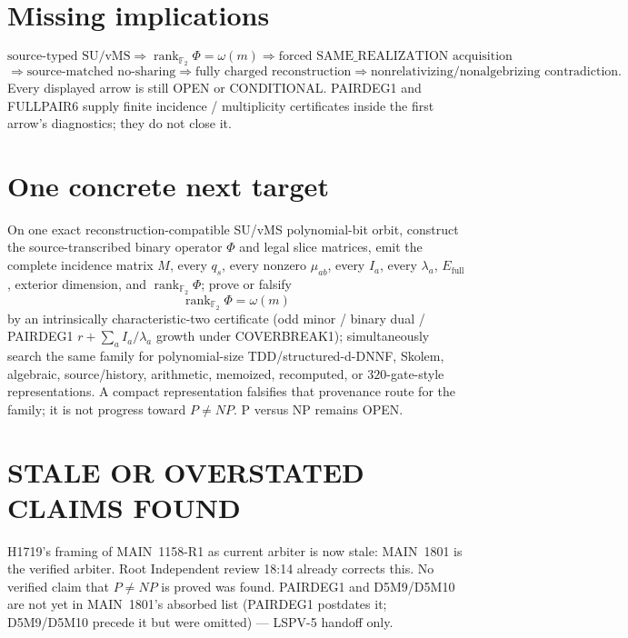 \documentclass[11pt]{article}
\begin{document}
\section*{Missing implications}
\[
\text{source-typed SU/vMS}
\Longrightarrow
\operatorname{rank}_{\mathbb F_2}\Phi=\omega(m)
\Longrightarrow
\text{forced SAME\_REALIZATION acquisition}
\]
\[
\Longrightarrow
\text{source-matched no-sharing}
\Longrightarrow
\text{fully charged reconstruction}
\Longrightarrow
\text{nonrelativizing/nonalgebrizing contradiction}.
\]
Every displayed arrow is still OPEN or CONDITIONAL. PAIRDEG1 and FULLPAIR6
supply finite incidence / multiplicity certificates inside the first arrow's
diagnostics; they do not close it.

\section*{One concrete next target}
On one exact reconstruction-compatible SU/vMS polynomial-bit orbit, construct the
source-transcribed binary operator $\Phi$ and legal slice matrices, emit the
complete incidence matrix $M$, every $q_s$, every nonzero $\mu_{ab}$, every
$I_a$, every $\lambda_a$, $E_{\mathrm{full}}$, exterior dimension, and
$\operatorname{rank}_{\mathbb F_2}\Phi$; prove or falsify
\[
\operatorname{rank}_{\mathbb F_2}\Phi=\omega(m)
\]
by an intrinsically characteristic-two certificate (odd minor / binary dual /
PAIRDEG1 $r+\sum_a I_a/\lambda_a$ growth under COVERBREAK1); simultaneously
search the same family for polynomial-size TDD/structured-d-DNNF, Skolem,
algebraic, source/history, arithmetic, memoized, recomputed, or $320$-gate-style
representations. A compact representation falsifies that provenance route for the
family; it is not progress toward $P\neq NP$. P versus NP remains OPEN.

\section*{STALE OR OVERSTATED CLAIMS FOUND}
H1719's framing of MAIN~1158-R1 as current arbiter is now stale: MAIN~1801 is
the verified arbiter. Root Independent review 18:14 already corrects this.
No verified claim that $P\neq NP$ is proved was found. PAIRDEG1 and D5M9/D5M10
are not yet in MAIN~1801's absorbed list (PAIRDEG1 postdates it; D5M9/D5M10
precede it but were omitted) --- LSPV-5 handoff only.

\end{document}
